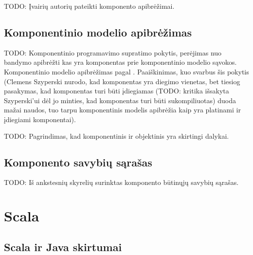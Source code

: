 TODO: Įvairių autorių pateikti komponento apibrėžimai.

\section{Komponentinio modelio apibrėžimas}

TODO: Komponentinio programavimo supratimo pokytis, perėjimas nuo
bandymo apibrėžti kas yra komponentas prie komponentinio modelio
sąvokos. Komponentinio modelio apibrėžimas pagal
\cite{classification-framework-for-scm}. Paaiškinimas, kuo svarbus šis
pokytis (Clemens Szyperski nurodo, kad komponentas yra diegimo
vienetas\cite{cs-beyond-object-oriented-programming}, bet tiesiog
pasakymas, kad komponentas turi būti įdiegiamas (TODO: kritika
išsakyta Szyperski'ui dėl jo minties, kad komponentas turi būti
sukompiliuotas) duoda mažai naudos, tuo tarpu komponentinis
modelis apibrėžia kaip yra platinami ir įdiegiami komponentai).

TODO: Pagrindimas, kad komponentinis ir objektinis yra skirtingi
dalykai.

\section{Komponento savybių sąrašas}

TODO: Iš ankstesnių skyrelių surinktas komponento būtinųjų savybių
sąrašas.

\chapter{Scala}

\section{Scala ir Java skirtumai}

